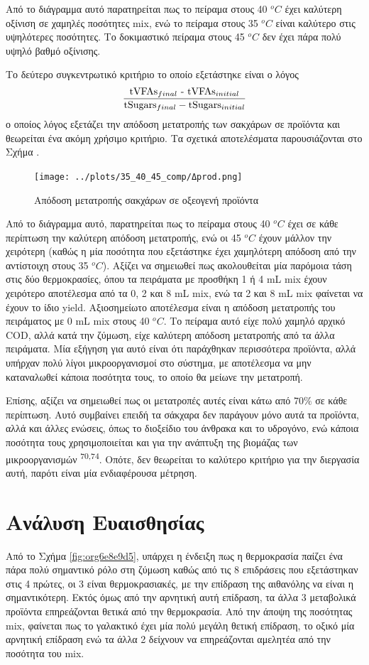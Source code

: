 \documentclass[11pt]{report}
\makeatletter
\newcommand{\citeprocitem}[2]{\hyper@linkstart{cite}{citeproc_bib_item_#1}#2\hyper@linkend}
\makeatother
\begin{document}
Από το διάγραμμα αυτό παρατηρείται πως το πείραμα στους 40 \(^oC\) έχει καλύτερη οξίνιση σε χαμηλές ποσότητες \acrshort{mix}, ενώ το πείραμα στους 35 \(^oC\) είναι καλύτερο στις υψηλότερες ποσότητες. Το δοκιμαστικό πείραμα στους 45 \(^oC\) δεν έχει πάρα πολύ υψηλό βαθμό οξίνισης.

Το δεύτερο συγκεντρωτικό κριτήριο το οποίο εξετάστηκε είναι ο λόγος \[ \frac{\text{tVFAs$_{final}$ - \text{tVFAs$_{initial}$}}}{\text{tSugars$_{final}$} -  \text{tSugars$_{initial}$}} \] ο οποίος λόγος εξετάζει την απόδοση μετατροπής των σακχάρων σε προϊόντα και θεωρείται ένα ακόμη χρήσιμο κριτήριο. Τα σχετικά αποτελέσματα παρουσιάζονται στο Σχήμα .

\begin{figure}[htbp]
\centering
\texttt{[image: ../plots/35\_40\_45\_comp/Δprod.png]}
\caption{Απόδοση μετατροπής σακχάρων σε οξεογενή προϊόντα}
\end{figure}

Από το διάγραμμα αυτό, παρατηρείται πως το πείραμα στους 40 \(^oC\) έχει σε κάθε περίπτωση την καλύτερη απόδοση μετατροπής, ενώ οι 45 \(^oC\) έχουν μάλλον την χειρότερη (καθώς η μία ποσότητα που εξετάστηκε έχει χαμηλότερη απόδοση από την αντίστοιχη στους 35 \(^oC\)). Αξίζει να σημειωθεί πως ακολουθείται μία παρόμοια τάση στις δύο θερμοκρασίες, όπου τα πειράματα με προσθήκη 1 ή 4 mL \acrshort{mix} έχουν χειρότερο αποτέλεσμα από τα 0, 2 και 8 mL \acrshort{mix}, ενώ τα 2 και 8 mL \acrshort{mix} φαίνεται να έχουν το ίδιο yield. Αξιοσημείωτο αποτέλεσμα είναι η απόδοση μετατροπής του πειράματος με 0 mL \acrshort{mix} στους 40 \(^oC\). Το πείραμα αυτό είχε πολύ χαμηλό αρχικό COD, αλλά κατά την ζύμωση, είχε καλύτερη απόδοση μετατροπής από τα άλλα πειράματα. Μία εξήγηση για αυτό είναι ότι παράχθηκαν περισσότερα προϊόντα, αλλά υπήρχαν πολύ λίγοι μικροοργανισμοί στο σύστημα, με αποτέλεσμα να μην καταναλωθεί κάποια ποσότητα τους, το οποίο θα μείωνε την μετατροπή.

Επίσης, αξίζει να σημειωθεί πως οι μετατροπές αυτές είναι κάτω από \(70 \%\) σε κάθε περίπτωση. Αυτό συμβαίνει επειδή τα σάκχαρα δεν παράγουν μόνο αυτά τα προϊόντα, αλλά και άλλες ενώσεις, όπως το διοξείδιο του άνθρακα και το υδρογόνο, ενώ κάποια ποσότητα τους χρησιμοποιείται και για την ανάπτυξη της βιομάζας των μικροοργανισμών \textsuperscript{\citeprocitem{70}{70},\citeprocitem{74}{74}}. Οπότε, δεν θεωρείται το καλύτερο κριτήριο για την διεργασία αυτή, παρότι είναι μία ενδιαφέρουσα μέτρηση.

\section{Ανάλυση Ευαισθησίας}
\label{sec:orga5b2e08}
Από το Σχήμα \ref{fig:org6e8e9d5}, υπάρχει η ένδειξη πως η θερμοκρασία παίζει ένα πάρα πολύ σημαντικό ρόλο στη ζύμωση καθώς από τις 8 επιδράσεις που εξετάστηκαν στις 4 πρώτες, οι 3 είναι θερμοκρασιακές, με την επίδραση της αιθανόλης να είναι η σημαντικότερη. Εκτός όμως από την αρνητική αυτή επίδραση, τα άλλα 3 μεταβολικά προϊόντα επηρεάζονται θετικά από την θερμοκρασία. Από την άποψη της ποσότητας \acrshort{mix}, φαίνεται πως το γαλακτικό έχει μία πολύ μεγάλη θετική επίδραση, το οξικό μία αρνητική επίδραση ενώ τα άλλα 2 δείχνουν να επηρεάζονται αμελητέα από την ποσότητα του \acrshort{mix}.
\end{document}
